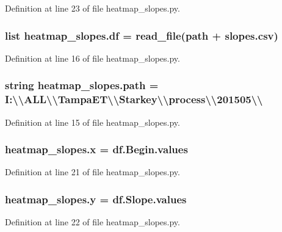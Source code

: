 Definition at line 23 of file heatmap\+\_\+slopes.\+py.

\hypertarget{namespaceheatmap__slopes_ac3ee4dd583b7c5cd73fbdc02298c4dcb}{}
\subsubsection[{df}]{\setlength{\rightskip}{0pt plus 5cm}list heatmap\+\_\+slopes.\+df = {\bf read\+\_\+file}({\bf path} + \textquotesingle{}slopes.\+csv\textquotesingle{})}\label{namespaceheatmap__slopes_ac3ee4dd583b7c5cd73fbdc02298c4dcb}


Definition at line 16 of file heatmap\+\_\+slopes.\+py.

\hypertarget{namespaceheatmap__slopes_ad5603c14f73e42c82621c93fe6d44b26}{}
\subsubsection[{path}]{\setlength{\rightskip}{0pt plus 5cm}string heatmap\+\_\+slopes.\+path = \textquotesingle{}I\+:\textbackslash{}\textbackslash{}\+A\+L\+L\textbackslash{}\textbackslash{}\+Tampa\+E\+T\textbackslash{}\textbackslash{}\+Starkey\textbackslash{}\textbackslash{}process\textbackslash{}\textbackslash{}201505\textbackslash{}\textbackslash{}\textquotesingle{}}\label{namespaceheatmap__slopes_ad5603c14f73e42c82621c93fe6d44b26}


Definition at line 15 of file heatmap\+\_\+slopes.\+py.

\hypertarget{namespaceheatmap__slopes_aa1c2bb69edf12eba2a35308bd4d5fc54}{}
\subsubsection[{x}]{\setlength{\rightskip}{0pt plus 5cm}heatmap\+\_\+slopes.\+x = df.\+Begin.\+values}\label{namespaceheatmap__slopes_aa1c2bb69edf12eba2a35308bd4d5fc54}


Definition at line 21 of file heatmap\+\_\+slopes.\+py.

\hypertarget{namespaceheatmap__slopes_afe0805836a2ce30217aa9093142eee6e}{}
\subsubsection[{y}]{\setlength{\rightskip}{0pt plus 5cm}heatmap\+\_\+slopes.\+y = df.\+Slope.\+values}\label{namespaceheatmap__slopes_afe0805836a2ce30217aa9093142eee6e}


Definition at line 22 of file heatmap\+\_\+slopes.\+py.

